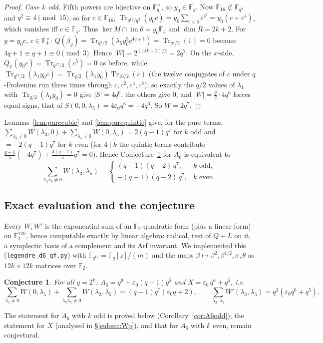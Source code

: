 \documentclass[11pt,a4paper]{amsart}
\newtheorem{conjecture}[theorem]{Conjecture}
\theoremstyle{definition}
\newcommand{\F}{\mathbb{F}}
\newcommand{\Tr}{\operatorname{Tr}}
\newcommand{\im}{\operatorname{im}}
\newcommand{\sgn}{\varepsilon_0}
\begin{document}
\begin{proof}
\emph{Case $k$ odd.} Fifth powers are bijective on $\F_q^\times$, so $y_0\in\F_q$. Now $\F_{16}\not\subset\F_{q^2}$ and $q^2\equiv4\pmod{15}$, so for $c\in\F_{16}$, $\Tr_{q^{12}/q^2}(y_0c)=y_0\sum_{i<6}c^{4^i}=y_0(c+c^4)$, which vanishes iff $c\in\F_4$. Thus $\ker M\cap\im\theta=y_0\F_4$ and $\dim R=2k+2$. For $y=y_0c$, $c\in\F_4^\times$: $Q(\beta_y)=\Tr_{q^2/2}(\lambda_5y_0^5c^{4q+1})=\Tr_{q^2/2}(1)=0$ because $4q+1\equiv q+1\equiv0\pmod3$. Hence $|W|=2^{(14k+2)/2}=2q^7$. On the $x$-side, $Q_x(y_0c)=\Tr_{q^{12}/2}(c^5)=0$ as before, while $\Tr_{q^{12}/2}(\lambda_1y_0c)=\Tr_{q/2}(\lambda_1y_0)\Tr_{16/2}(c)$ (the twelve conjugates of $c$ under $q$-Frobenius run three times through $c,c^2,c^4,c^8$); so exactly the $q/2$ values of $\lambda_1$ with $\Tr_{q/2}(\lambda_1y_0)=0$ give $|S|=4q^6$, the others give $0$, and $|W|=\frac q2\cdot4q^6$ forces equal signs, that of $S(0,0,\lambda_5)=4\sgn q^6=+4q^6$. So $W=2q^7$.
\end{proof}

Lemmas~\ref{lem:purecubic} and \ref{lem:purequintic} give, for the pure terms, $\sum_{\lambda_3\ne0}W(\lambda_3,0)+\sum_{\lambda_5\ne0}W(0,\lambda_5)=2(q-1)q^7$ for $k$ odd and $=-2(q-1)q^7$ for $k$ even (for $4\mid k$ the quintic terms contribute $\frac{q-1}5(-4q^7)+\frac{4(q-1)}5q^7=0$). Hence Conjecture~\ref{conj:A6X} for $A_6$ is equivalent to
\begin{equation}\label{eq:mixedsum}
\sum_{\lambda_3\lambda_5\ne0}W(\lambda_3,\lambda_5)=\begin{cases}(q-1)(q-2)\,q^7,&k\text{ odd},\\ -(q-1)(q-2)\,q^7,&k\text{ even}.\end{cases}
\end{equation}

\subsection{Exact evaluation and the conjecture}
Every $W,W'$ is the exponential sum of an $\F_2$-quadratic form (plus a linear form) on $\F_2^{12k}$, hence computable exactly by linear algebra: radical, test of $Q+L$ on it, a symplectic basis of a complement and its Arf invariant. We implemented this (\texttt{legendre\_d6\_qf.py}) with $\F_{q^{12}}=\F_q[z]/(m)$ and the maps $\beta\mapsto\beta^2,\beta^{1/2},\sigma,\theta$ as $12k\times12k$ matrices over $\F_2$.

\begin{conjecture}\label{conj:A6X}
For all $q=2^k$: $A_6=q^9+\sgn(q-1)q^5$ and $X=\sgn\,q^6+q^5$, i.e.
\[
\sum_{\lambda_5\ne0}W(0,\lambda_5)+\sum_{\lambda_3\lambda_5\ne0}W(\lambda_3,\lambda_5)=(q-1)q^7(\sgn q+2),\qquad \sum_{\lambda_3,\lambda_5}W'(\lambda_3,\lambda_5)=q^3(\sgn q^6+q^5).
\]
\end{conjecture}
The statement for $A_6$ with $k$ odd is proved below (Corollary~\ref{cor:A6odd}); the statement for $X$ (analysed in \S\ref{subsec:Wp}), and that for $A_6$ with $k$ even, remain conjectural.
\end{document}
